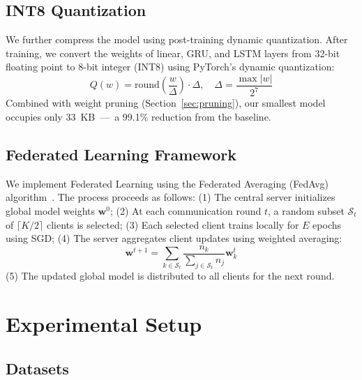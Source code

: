 \documentclass[10pt,journal]{IEEEtran}
\begin{document}
\subsection{INT8 Quantization}
\label{sec:quantization}

We further compress the model using post-training dynamic quantization. After training, we convert the weights of linear, GRU, and LSTM layers from 32-bit floating point to 8-bit integer (INT8) using PyTorch's dynamic quantization:
\begin{equation}
Q(w) = \text{round}\left(\frac{w}{\Delta}\right) \cdot \Delta, \quad \Delta = \frac{\max|w|}{2^{7}}
\label{eq:quant}
\end{equation}
Combined with weight pruning (Section~\ref{sec:pruning}), our smallest model occupies only 33~KB~---~a 99.1\% reduction from the baseline.

\subsection{Federated Learning Framework}
\label{sec:fl}

We implement Federated Learning using the Federated Averaging (FedAvg) algorithm~\cite{mcmahan2017communication}. The process proceeds as follows: (1) The central server initializes global model weights $\mathbf{w}^0$; (2) At each communication round $t$, a random subset $\mathcal{S}_t$ of $\lceil K/2 \rceil$ clients is selected; (3) Each selected client trains locally for $E$ epochs using SGD; (4) The server aggregates client updates using weighted averaging:
\begin{equation}
\mathbf{w}^{t+1} = \sum_{k \in \mathcal{S}_t} \frac{n_k}{\sum_{j \in \mathcal{S}_t} n_j} \mathbf{w}_k^t
\label{eq:fedavg}
\end{equation}
(5) The updated global model is distributed to all clients for the next round.

\section{Experimental Setup}
\label{sec:setup}

\subsection{Datasets}
\label{sec:datasets}
\end{document}

